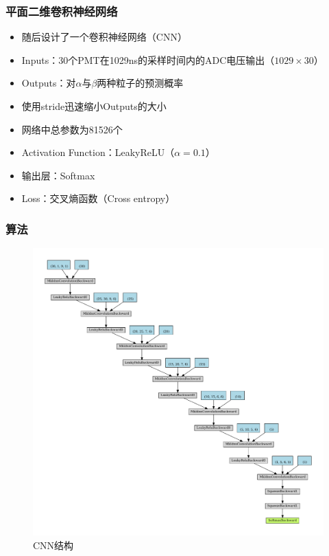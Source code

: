 \documentclass{beamer}
\begin{document}
\begin{frame}
\frametitle{平面二维卷积神经网络}
\begin{itemize}
    \item <1-> 随后设计了一个卷积神经网络（CNN）
    \item <2-> Inputs：30个PMT在1029ns的采样时间内的ADC电压输出（$1029\times30$）
    \item <3-> Outputs：对$\alpha$与$\beta$两种粒子的预测概率
    \item <4-> 使用stride迅速缩小Outputs的大小
    \item <5-> 网络中总参数为81526个
    \item <6-> Activation Function：LeakyReLU（$\alpha=0.1$）
    \item <7-> 输出层：Softmax
    \item <7-> Loss：交叉熵函数（Cross entropy）
\end{itemize}
\end{frame}

\begin{frame}
\frametitle{算法}
\begin{figure}[H]
    \centering
    \includegraphics[width=0.6\linewidth]{net.pdf}
    \caption{CNN结构}
\end{figure}
\end{frame}
\end{document}
